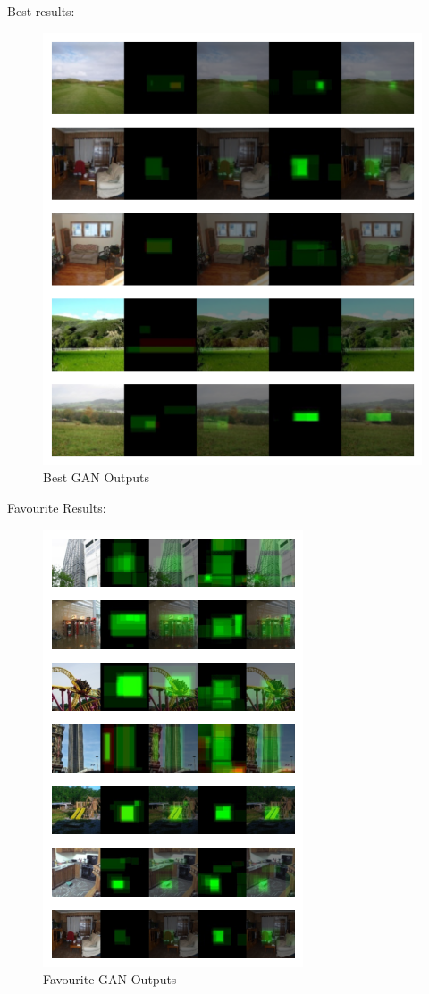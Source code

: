 \documentclass{UoYCSproject}
\begin{document}
Best results:
\begin{figure}[ht]
    \centering
    \includegraphics[width=\linewidth]{Best GAN Outputs}
    \caption{Best GAN Outputs}
    \label{fig:GANBestOutput}
\end{figure}

Favourite Results:
\begin{figure}[ht]
    \centering
    \includegraphics[]{Good GAN Outputs}
    \caption{Favourite GAN Outputs}
    \label{fig:GANGoodOutput}
\end{figure}
\end{document}

